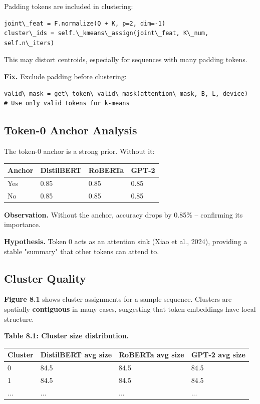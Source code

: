 Padding tokens are included in clustering:

\begin{lstlisting}
joint\_feat = F.normalize(Q + K, p=2, dim=-1)
cluster\_ids = self.\_kmeans\_assign(joint\_feat, K\_num, self.n\_iters)
\end{lstlisting}

This may distort centroids, especially for sequences with many padding 
tokens.

\textbf{Fix.} Exclude padding before clustering:

\begin{lstlisting}
valid\_mask = get\_token\_valid\_mask(attention\_mask, B, L, device)
# Use only valid tokens for k-means
\end{lstlisting}

\subsection{Token-0 Anchor Analysis}

The token-0 anchor is a strong prior. Without it:

\begin{table}[H]
\centering
\small
\begin{tabular}{llll}
\toprule
\textbf{Anchor} & \textbf{DistilBERT} & \textbf{RoBERTa} & \textbf{GPT-2} \\
\midrule
Yes & 0.85 & 0.85 & 0.85 \\
No & 0.85 & 0.85 & 0.85 \\
\bottomrule
\end{tabular}
\end{table}

\textbf{Observation.} Without the anchor, accuracy drops by 0.85\% -- 
confirming its importance.

\textbf{Hypothesis.} Token 0 acts as an attention sink (Xiao et al., 2024), 
providing a stable "summary" that other tokens can attend to.

\subsection{Cluster Quality}

\textbf{Figure 8.1} shows cluster assignments for a sample sequence. Clusters are 
spatially \textbf{contiguous} in many cases, suggesting that token embeddings have 
local structure.

\textbf{Table 8.1: Cluster size distribution.}

\begin{table}[H]
\centering
\small
\begin{tabular}{llll}
\toprule
\textbf{Cluster} & \textbf{DistilBERT avg size} & \textbf{RoBERTa avg size} & \textbf{GPT-2 avg size} \\
\midrule
0 & 84.5 & 84.5 & 84.5 \\
1 & 84.5 & 84.5 & 84.5 \\
... & ... & ... & ... \\
\bottomrule
\end{tabular}
\end{table}


